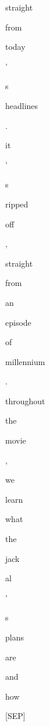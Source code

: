 \documentclass[varwidth=150mm]{standalone}
\begin{document}
\begin{CJK*}{UTF8}{gbsn}
{{{\colorbox{red!0.0}{\strut straight} \colorbox{red!0.0}{\strut from} \colorbox{red!0.0}{\strut today} \colorbox{red!0.0}{\strut '} \colorbox{red!0.0}{\strut s} \colorbox{red!1.9794472455978394}{\strut headlines} \colorbox{red!0.0}{\strut .} \colorbox{red!1.0722955465316772}{\strut it} \colorbox{red!0.0}{\strut '} \colorbox{red!2.3181796073913574}{\strut s} \colorbox{red!0.0}{\strut ripped} \colorbox{red!0.0}{\strut off} \colorbox{red!1.6531765460968018}{\strut ,} \colorbox{red!0.0}{\strut straight} \colorbox{red!0.0}{\strut from} \colorbox{red!0.0}{\strut an} \colorbox{red!0.0}{\strut episode} \colorbox{red!0.0}{\strut of} \colorbox{red!7.58107328414917}{\strut millennium} \colorbox{red!0.0}{\strut .} \colorbox{red!0.0}{\strut throughout} \colorbox{red!3.4431238174438477}{\strut the} \colorbox{red!13.71634292602539}{\strut movie} \colorbox{red!0.0}{\strut ,} \colorbox{red!35.55950164794922}{\strut we} \colorbox{red!1.0324547290802002}{\strut learn} \colorbox{red!0.0}{\strut what} \colorbox{red!1.1731795072555542}{\strut the} \colorbox{red!1.7535550594329834}{\strut jack}\colorbox{red!1.7108666896820068}{\strut al} \colorbox{red!0.0}{\strut '} \colorbox{red!0.0}{\strut s} \colorbox{red!0.0}{\strut plans} \colorbox{red!0.0}{\strut are} \colorbox{red!0.0}{\strut and} \colorbox{red!0.0}{\strut how} \colorbox{red!5.890176773071289}{\strut [SEP]}
}}}
\end{CJK*}
\end{document}

